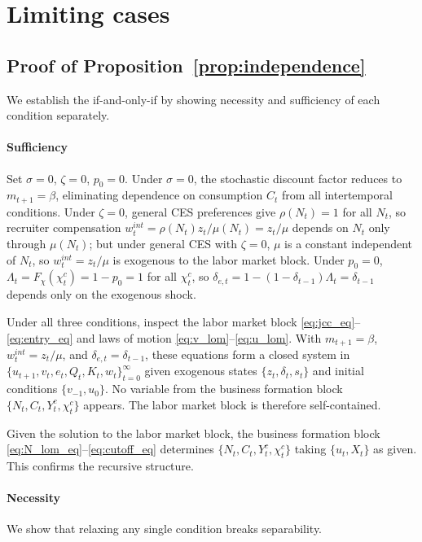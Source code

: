 \documentclass[authoryear, review, 12pt]{elsarticle}
\begin{document}


\section{Limiting cases}
\label{app:limiting_cases}

\subsection*{Proof of Proposition~\ref{prop:independence}}

We establish the if-and-only-if by showing necessity 
and sufficiency of each condition separately.

\paragraph{Sufficiency}
Set $\sigma=0$, $\zeta=0$, $p_0=0$. Under $\sigma=0$, 
the stochastic discount factor reduces to 
$m_{t+1}=\beta$, eliminating dependence on 
consumption $C_t$ from all intertemporal conditions. 
Under $\zeta=0$, general CES preferences give 
$\rho(N_t)=1$ for all $N_t$, so recruiter 
compensation $w_t^{int}=\rho(N_t)z_t/\mu(N_t) = 
z_t/\mu$ depends on $N_t$ only through $\mu(N_t)$; 
but under general CES with $\zeta=0$, $\mu$ is a 
constant independent of $N_t$, so $w_t^{int}=z_t/\mu$ 
is exogenous to the labor market block. Under $p_0=0$, 
$\Lambda_t = F_\chi(\chi_t^c) = 1-p_0 = 1$ for all 
$\chi_t^c$, so $\delta_{e,t}=1-(1-\delta_{t-1})\Lambda_t 
= \delta_{t-1}$ depends only on the exogenous shock.

Under all three conditions, inspect the labor market 
block \eqref{eq:jcc_eq}--\eqref{eq:entry_eq} and 
laws of motion \eqref{eq:v_lom}--\eqref{eq:u_lom}. 
With $m_{t+1}=\beta$, $w_t^{int}=z_t/\mu$, and 
$\delta_{e,t}=\delta_{t-1}$, these equations form 
a closed system in 
$\{u_{t+1},v_t,e_t,Q_t,K_t,w_t\}_{t=0}^\infty$ 
given exogenous states $\{z_t,\delta_t,s_t\}$ and 
initial conditions $\{v_{-1},u_0\}$. No variable 
from the business formation block 
$\{N_t,C_t,Y_t^c,\chi_t^c\}$ appears. The labor 
market block is therefore self-contained.

Given the solution to the labor market block, 
the business formation block 
\eqref{eq:N_lom_eq}--\eqref{eq:cutoff_eq} 
determines $\{N_t,C_t,Y_t^c,\chi_t^c\}$ taking 
$\{u_t,X_t\}$ as given. This confirms the 
recursive structure.

\paragraph{Necessity}
We show that relaxing any single condition 
breaks separability.
\end{document}
